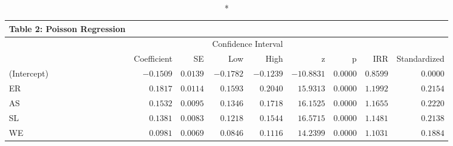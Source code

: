 \begin{longtable}{l|rrrrrrrr}
\caption*{
{\large Table 2: Poisson Regression}
} \\ 
\toprule
\multicolumn{1}{l}{} &  &  & \multicolumn{2}{c}{Confidence Interval} &  &  &  &  \\ 
\cmidrule(lr){4-5}
\multicolumn{1}{l}{} & Coefficient & SE & Low & High & z & p & IRR & Standardized \\ 
\midrule
(Intercept) & $-0.1509$ & $0.0139$ & $-0.1782$ & $-0.1239$ & $-10.8831$ & $0.0000$ & $0.8599$ & $0.0000$ \\ 
ER & $0.1817$ & $0.0114$ & $0.1593$ & $0.2040$ & $15.9313$ & $0.0000$ & $1.1992$ & $0.2154$ \\ 
AS & $0.1532$ & $0.0095$ & $0.1346$ & $0.1718$ & $16.1525$ & $0.0000$ & $1.1655$ & $0.2220$ \\ 
SL & $0.1381$ & $0.0083$ & $0.1218$ & $0.1544$ & $16.5715$ & $0.0000$ & $1.1481$ & $0.2138$ \\ 
WE & $0.0981$ & $0.0069$ & $0.0846$ & $0.1116$ & $14.2399$ & $0.0000$ & $1.1031$ & $0.1884$ \\ 
\bottomrule
\end{longtable}

